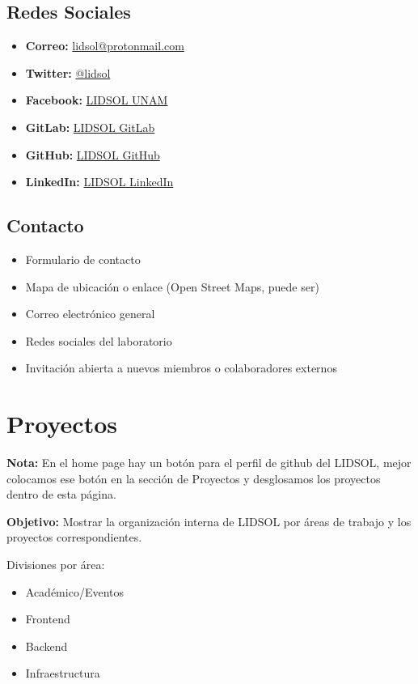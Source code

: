 \documentclass[12pt]{article}
\begin{document}
\subsection{Redes Sociales}
\begin{itemize}[label=--]
    \item \textbf{Correo:} \href{mailto:lidsol@protonmail.com}{lidsol@protonmail.com}
    \item \textbf{Twitter:} \href{https://twitter.com/lidsol}{@lidsol}
    \item \textbf{Facebook:} \href{https://facebook.com/lidsol.unam}{LIDSOL UNAM}
    \item \textbf{GitLab:} \href{https://gitlab.com/lidsol}{LIDSOL GitLab}
    \item \textbf{GitHub:} \href{https://github.com/lidsol}{LIDSOL GitHub}
    \item \textbf{LinkedIn:} \href{https://linkedin.com/company/lidsol/}{LIDSOL LinkedIn}
\end{itemize}

\subsection{Contacto}
\begin{itemize}[label=--]
    \item Formulario de contacto
    \item Mapa de ubicación o enlace (Open Street Maps, puede ser)
    \item Correo electrónico general
    \item Redes sociales del laboratorio
    \item Invitación abierta a nuevos miembros o colaboradores externos
\end{itemize}

\section{Proyectos}
\textbf{Nota:} En el home page hay un botón para el perfil de github del LIDSOL, mejor colocamos ese botón en la sección de Proyectos y desglosamos los proyectos dentro de esta página.

\textbf{Objetivo:} Mostrar la organización interna de LIDSOL por áreas de trabajo y los proyectos correspondientes.

Divisiones por área:
\begin{itemize}
    \item Académico/Eventos
    \item Frontend
    \item Backend
    \item Infraestructura
\end{itemize}
\end{document}
